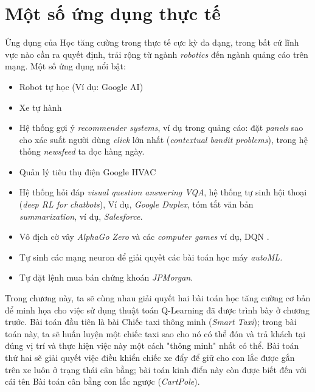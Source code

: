 \documentclass[12pt,a4paper]{report}
\begin{document}
\section{Một số ứng dụng thực tế}
Ứng dụng của Học tăng cường trong thực tế cực kỳ đa dạng, trong bất cứ lĩnh vực nào cần ra quyết định, trải rộng từ ngành \textit{robotics} đến ngành quảng cáo trên mạng. Một số ứng dụng nổi bật:
\begin{itemize}
	\item Robot tự học (Ví dụ: Google AI)
	\item Xe tự hành
	\item Hệ thống gợi ý \textit{recommender systems}, ví dụ trong quảng cáo: đặt \textit{panels} sao cho xác suất người dùng \textit{click} lớn nhất (\textit{contextual bandit problems}), trong hệ thống \textit{newsfeed} ta đọc hàng ngày.
	\item Quản lý tiêu thụ điện Google HVAC
	\item  Hệ thống hỏi đáp \textit{visual question answering VQA}, hệ thống tự sinh hội thoại (\textit{deep RL for chatbots}), Ví dụ, \textit{Google Duplex}, tóm tắt văn bản \textit{summarization}, ví dụ, \textit{Salesforce.}
	\item Vô địch cờ vây \textit{AlphaGo Zero} và các \textit{computer games} ví dụ, DQN .
	\item Tự sinh các mạng neuron để giải quyết các bài toán học máy \textit{autoML.}
	\item Tự đặt lệnh mua bán chứng khoán \textit{JPMorgan}.
	 
\end{itemize}
Trong chương này, ta sẽ cùng nhau giải quyết hai bài toán học tăng cường cơ bản để minh
họa cho việc sử dụng thuật toán Q-Learning đã được trình bày ở chương trước. Bài toán đầu
tiên là bài Chiếc taxi thông minh (\textit{Smart Taxi}); trong bài toán này, ta sẽ huấn luyện một
chiếc taxi sao cho nó có thể đón và trả khách tại đúng vị trí và thực hiện việc này một cách
"thông minh" nhất có thể. Bài toán thứ hai sẽ giải quyết việc điều khiển chiếc xe đẩy để giữ
cho con lắc được gắn trên xe luôn ở trạng thái cân bằng; bài toán kinh điển này còn được biết
đến với cái tên Bài toán cân bằng con lắc ngược (\textit{CartPole}).
\end{document}
